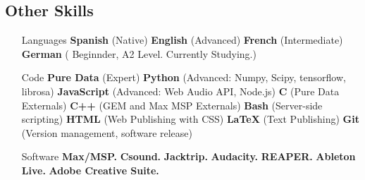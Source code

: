 \documentclass[12pt,overlapped]{res}%
\begin{document}
\begin{resume}
\section{Other Skills}%
\label{sec:OtherSkills}%
\fullline%
\begin{itemize}[align=parleft,leftmargin=2.25cm,labelwidth=2cm]
\item[Languages]
\textbf{Spanish}
 (Native) 
\textbf{English}
 (Advanced) 
\textbf{French}
 (Intermediate) 
\textbf{German}
 ( Beginnder, A2 Level. Currently Studying.) 
\item[Code]
\textbf{Pure Data}
 (Expert) 
\textbf{Python}
 (Advanced: Numpy, Scipy, tensorflow, librosa) 
\textbf{JavaScript}
 (Advanced: Web Audio API, Node.js) 
\textbf{C}
 (Pure Data Externals) 
\textbf{C++}
 (GEM and Max MSP Externals) 
\textbf{Bash}
 (Server{-}side scripting) 
\textbf{HTML}
 (Web Publishing with CSS) 
\textbf{\LaTeX}
 (Text Publishing) 
\textbf{Git}
 (Version management, software release) 
\item[Software]
\textbf{Max/MSP.}
\textbf{Csound.}
\textbf{Jacktrip.}
\textbf{Audacity.}
\textbf{REAPER.}
\textbf{Ableton Live.}
\textbf{Adobe Creative Suite.}
\end{itemize}


\end{resume}%
\end{document}
